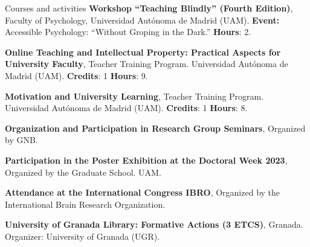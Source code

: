 \begin{rubric}{Courses and activities}
 \entry*[October 10, 2025] \textbf{Workshop “Teaching Blindly” (Fourth Edition)}, Faculty of Psychology, Universidad Autónoma de Madrid (UAM). \textbf{Event:} Accessible Psychology: “Without Groping in the Dark.”  \textbf{Hours}: 2.
 
 
 \textbf{Online Teaching and Intellectual Property: Practical Aspects for University Faculty}, Teacher Training Program. Universidad Autónoma de Madrid (UAM). \textbf{Credits}: 1 \textbf{Hours}: 9.

\entry*[November 4-11] \textbf{Motivation and University Learning}, Teacher Training Program. Universidad Autónoma de Madrid (UAM). \textbf{Credits}: 1 \textbf{Hours}: 8.

  \textbf{Organization and Participation in Research Group Seminars}, Organized by GNB.

\entry*[June 2023] \textbf{Participation in the Poster Exhibition at the Doctoral Week 2023}, Organized by the Graduate School. UAM.

\entry*[September 2023] \textbf{Attendance at the International Congress IBRO}, Organized by the International Brain Research Organization.

 \textbf{University of Granada Library: Formative Actions (3 ETCS)}, Granada. Organizer: University of Granada (UGR).

\end{rubric}
